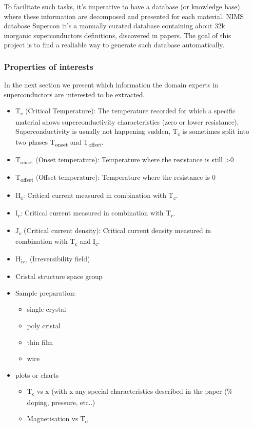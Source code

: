 \documentclass{article}
\begin{document}
To facilitate such tasks, it's imperative to have a database (or knowledge base) where these information are decomposed and presented for each material. 
NIMS database Supercon it's a manually curated database containing about 32k inorganic superconductors definitions, discovered in papers. 
The goal of this project is to find a realiable way to generate such database automatically. 

\subsubsection{Properties of interests}
In the next section we present which information the domain experts in superconductors are interested to be extracted. 

\begin{itemize}
    \item T\textsubscript{c} (Critical Temperature): The temperature recorded for which a specific material shows superconductivity characteristics (zero or lower resistance). Superconductivity is usually not happening sudden, T\textsubscript{c} is sometimes split into two phases T\textsubscript{onset} and T\textsubscript{offset}.
    \item T\textsubscript{onset} (Onset temperature): Temperature where the resistance is still \textgreater 0
    \item T\textsubscript{offset} (Offset temperature): Temperature where the resistance is 0
    \item H\textsubscript{c}: Critical current measured in combination with T\textsubscript{c}.
    \item I\textsubscript{c}: Critical current measured in combination with T\textsubscript{c}.
    \item J\textsubscript{c} (Critical current density): Critical current density measured in combination with T\textsubscript{c} and I\textsubscript{c}.
    \item H\textsubscript{ivr} (Irreversibility field) %
    \item Cristal structure space group %
    \item Sample preparation:
    \begin{itemize}
        \item single crystal
        \item poly cristal 
        \item thin film
        \item wire
    \end{itemize}%
    \item plots or charts
    \begin{itemize}
        \item T\textsubscript{c} vs x (with x any special characteristics described in the paper (\% doping, pressure, etc..) 
        \item Magnetisation vs T\textsubscript{c}
    \end{itemize}
\end{itemize}
\end{document}
